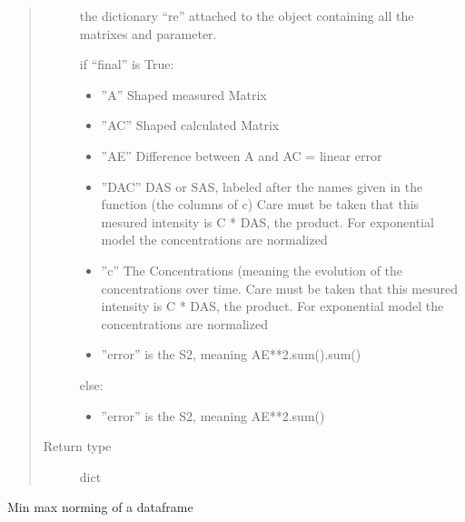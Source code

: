 \documentclass[letterpaper,10pt,english]{sphinxmanual}
\begin{document}
\begin{fulllineitems}
\begin{quote}
\begin{description}
 \textendash{} the dictionary “re” attached to the object containing all the matrixes and parameter.

if “final” is True:
\begin{itemize}
\item {} 
”A” Shaped measured Matrix

\item {} 
”AC” Shaped calculated Matrix

\item {} 
”AE” Difference between A and AC = linear error

\item {} 
”DAC” DAS or SAS, labeled after the names given in the function (the columns of c) Care must be taken that this mesured intensity is C * DAS, the product. For exponential model the concentrations are normalized

\item {} 
”c” The Concentrations (meaning the evolution of the concentrations over time. Care must be taken that this mesured intensity is C * DAS, the product. For exponential model the concentrations are normalized

\item {} 
”error” is the S2, meaning AE**2.sum().sum()

\end{itemize}

else:
\begin{itemize}
\item {} 
”error” is the S2, meaning AE**2.sum()

\end{itemize}


\item[{Return type}] \leavevmode
dict

\end{description}\end{quote}

\end{fulllineitems}


\begin{fulllineitems}
\label{\detokenize{plot_func:plot_func.norm}}
Min max norming of a dataframe

\end{fulllineitems}
\end{document}

